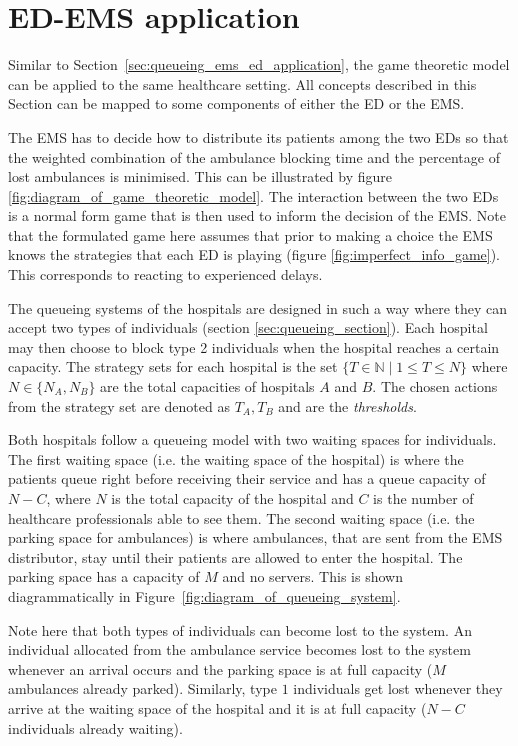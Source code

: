 \section{ED-EMS application}\label{sec:game_ems_ed_application}

Similar to Section~\ref{sec:queueing_ems_ed_application}, the game theoretic
model can be applied to the same healthcare setting.
All concepts described in this Section can be mapped to some components of
either the ED or the EMS.

The EMS has to decide how to distribute its patients among the two EDs so that
the weighted combination of the ambulance blocking time and the percentage of
lost ambulances is minimised.
This can be illustrated by figure \ref{fig:diagram_of_game_theoretic_model}.
The interaction between the two
EDs is a normal form game that is then used to inform the decision of the EMS.
Note that the formulated game here assumes that prior to making a choice the
EMS knows the strategies that each ED is playing (figure
\ref{fig:imperfect_info_game}).
This corresponds to reacting to experienced delays.

The queueing systems of the hospitals are designed in such a way where they can
accept two types of individuals (section \ref{sec:queueing_section}).
Each hospital may then choose to block type 2 individuals
when the hospital reaches a certain capacity.
The strategy sets for each hospital is the set
\( \{T \in \mathbb{N} \;|\; 1 \leq T \leq N\} \) where \(N \in\{N_A, N_B\}\) are
the total capacities of hospitals \(A\) and \(B\).
The chosen actions from the strategy set are denoted as \(T_A, T_B\) and are
the \textit{thresholds}.

Both hospitals follow a queueing model with two waiting spaces for
individuals.
The first waiting space (i.e. the waiting space of the hospital) is where the
patients queue right before receiving
their service and has a queue capacity of \( N - C \), where \(N\) is the total
capacity of the hospital and \(C\) is the number of healthcare
professionals able to see them.
The second waiting space (i.e. the parking space for ambulances) is where
ambulances, that are sent from the
EMS distributor, stay until their patients are allowed to enter the hospital.
The parking space has a capacity of \(M\) and no servers.
This is shown diagrammatically in Figure~\ref{fig:diagram_of_queueing_system}.

Note here that both types of individuals can become lost to the system.
An individual allocated from the ambulance service becomes lost to the system
whenever
an arrival occurs and the parking space is at full capacity (\(M\)
ambulances already parked).
Similarly, type \(1\) individuals get lost whenever they arrive at the waiting
space of the hospital and it is at full capacity (\(N - C\) individuals already
waiting).

